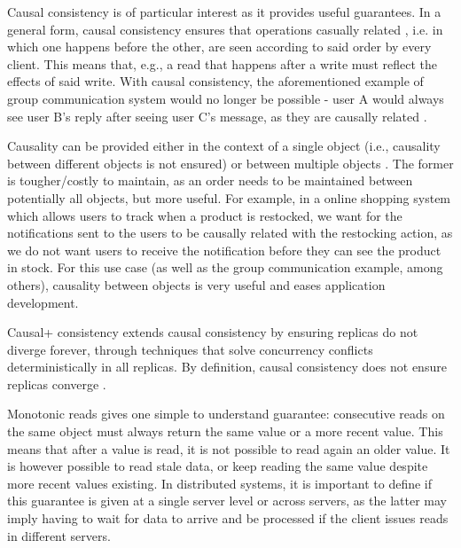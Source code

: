 Causal consistency \cite{cops,eiger,chainreaction,cure} is of particular interest as it provides useful guarantees.
In a general form, causal consistency ensures that operations casually related \cite{lamport2019time}, i.e. in which one happens before the other, are seen according to said order by every client.
This means that, e.g., a read that happens after a write must reflect the effects of said write.
With causal consistency, the aforementioned example of group communication system would no longer be possible - user A would always see user B's reply after seeing user C's message, as they are causally related \cite{lamport2019time, walter}.


Causality can be provided either in the context of a single object (i.e., causality between different objects is not ensured) or between multiple objects \cite{understandingEC}.
The former is tougher/costly to maintain, as an order needs to be maintained between potentially all objects, but more useful.
For example, in a online shopping system which allows users to track when a product is restocked, 
we want
for the notifications sent to the users to be causally related with the restocking action, as we do not want users to receive the notification before they can see the product in stock.
For this use case (as well as the group communication example, among others), causality between objects is very useful and eases application development.

Causal+ consistency \cite{cops,chainreaction,cure} extends causal consistency by ensuring replicas do not diverge forever, through techniques that solve concurrency conflicts deterministically in all replicas.
By definition, causal consistency does not ensure replicas converge \cite{cops,chainreaction}.

Monotonic reads \cite{session, understandingEC} gives one simple to understand guarantee: consecutive reads on the same object must always return the same value or a more recent value.
This means that after a value is read, it is not possible to read again an older value.
It is however possible to read stale data, or keep reading the same value despite more recent values existing.
In distributed systems, it is important to define if this guarantee is given at a single server level or across servers, as the latter may imply having to wait for data to arrive and be processed if the client issues reads in different servers.

